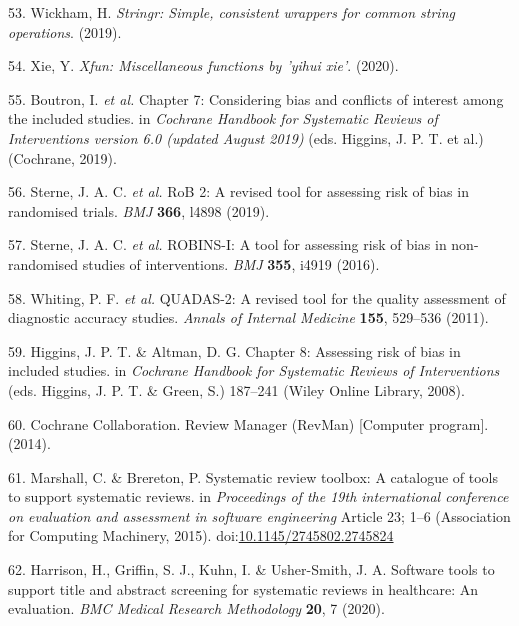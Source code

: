 \documentclass[a4paper, twoside]{templates/ociamthesis}
\begin{document}
\leavevmode\hypertarget{ref-stringr}{}%
53. Wickham, H. \emph{Stringr: Simple, consistent wrappers for common string operations}. (2019).

\leavevmode\hypertarget{ref-xfun}{}%
54. Xie, Y. \emph{Xfun: Miscellaneous functions by 'yihui xie'}. (2020).

\leavevmode\hypertarget{ref-cochranechpt7}{}%
55. Boutron, I. \emph{et al.} Chapter 7: Considering bias and conflicts of interest among the included studies. in \emph{Cochrane Handbook for Systematic Reviews of Interventions version 6.0 (updated August 2019)} (eds. Higgins, J. P. T. et al.) (Cochrane, 2019).

\leavevmode\hypertarget{ref-sterne2019rob}{}%
56. Sterne, J. A. C. \emph{et al.} RoB 2: A revised tool for assessing risk of bias in randomised trials. \emph{BMJ} \textbf{366}, l4898 (2019).

\leavevmode\hypertarget{ref-sterne2016robins}{}%
57. Sterne, J. A. C. \emph{et al.} ROBINS-I: A tool for assessing risk of bias in non-randomised studies of interventions. \emph{BMJ} \textbf{355}, i4919 (2016).

\leavevmode\hypertarget{ref-whiting2011quadas}{}%
58. Whiting, P. F. \emph{et al.} QUADAS-2: A revised tool for the quality assessment of diagnostic accuracy studies. \emph{Annals of Internal Medicine} \textbf{155}, 529--536 (2011).

\leavevmode\hypertarget{ref-higgins2008assessing}{}%
59. Higgins, J. P. T. \& Altman, D. G. Chapter 8: Assessing risk of bias in included studies. in \emph{Cochrane Handbook for Systematic Reviews of Interventions} (eds. Higgins, J. P. T. \& Green, S.) 187--241 (Wiley Online Library, 2008).

\leavevmode\hypertarget{ref-cochrane2014review}{}%
60. Cochrane Collaboration. Review Manager (RevMan) {[}Computer program{]}. (2014).

\leavevmode\hypertarget{ref-marshall2015systematic}{}%
61. Marshall, C. \& Brereton, P. Systematic review toolbox: A catalogue of tools to support systematic reviews. in \emph{Proceedings of the 19th international conference on evaluation and assessment in software engineering} Article 23; 1--6 (Association for Computing Machinery, 2015). doi:\href{https://doi.org/10.1145/2745802.2745824}{10.1145/2745802.2745824}

\leavevmode\hypertarget{ref-harrison2020software}{}%
62. Harrison, H., Griffin, S. J., Kuhn, I. \& Usher-Smith, J. A. Software tools to support title and abstract screening for systematic reviews in healthcare: An evaluation. \emph{BMC Medical Research Methodology} \textbf{20}, 7 (2020).
\end{document}
